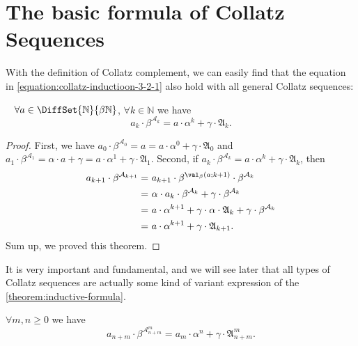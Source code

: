 \section{The basic formula of Collatz Sequences}\label{sec:the-basic-fomula-of-collatz-sequences}

With the definition of Collatz complement, we can easily find that the equation in \cref{equation:collatz-inductioon-3-2-1} also hold with all general Collatz sequences:
\begin{theorem}~\label{theorem:inductive-formula}
$\forall a \in \DiffSet{\mathbb{N}}{\beta\mathbb{N}}$, $\forall k \in \mathbb{N}$ we have
\[ a_k \cdot \beta^{\mathcal{A}_k} = a \cdot\alpha^k + \gamma\cdot\mathfrak{A}_{k}. \]
\end{theorem}
\begin{proof}
    First, we have $a_0 \cdot \beta^{\mathcal{A}_0} = a = a \cdot \alpha^{0} + \gamma \cdot \mathfrak{A}_0$ and $a_1 \cdot \beta^{\mathcal{A}_1} = \alpha \cdot a + \gamma = a \cdot \alpha^{1} + \gamma \cdot \mathfrak{A}_1$.\newline
    Second, if $a_k \cdot \beta^{\mathcal{A}_k} = a \cdot\alpha^k + \gamma\cdot\mathfrak{A}_{k}$, then
    \begin{align*}
        a_{k+1} \cdot \beta^{\mathcal{A}_{k+1}}
        =&\ a_{k+1} \cdot \beta^{\val_{\beta}(a;k+1)} \cdot \beta^{\mathcal{A}_{k}} \\
        =&\ \alpha \cdot a_k \cdot \beta^{\mathcal{A}_k} + \gamma \cdot \beta^{\mathcal{A}_k} \\
        =&\ a \cdot \alpha^{k+1} + \gamma \cdot \alpha \cdot \mathfrak{A}_{k} + \gamma \cdot \beta^{\mathcal{A}_k} \\
        =&\ a \cdot \alpha^{k+1} + \gamma \cdot \mathfrak{A}_{k+1}.
    \end{align*}
    Sum up, we proved this theorem.
\end{proof}
It is very important and fundamental, and we will see later that all types of Collatz sequences are actually some kind of variant expression of the \cref{theorem:inductive-formula}.
\begin{corollary}
$\forall m, n \ge 0$ we have
\[ a_{n+m} \cdot \beta^{\mathcal{A}_{n+m}^{m}} = a_{m} \cdot\alpha^{n} + \gamma\cdot\mathfrak{A}_{n+m}^{m}. \]
\end{corollary}
